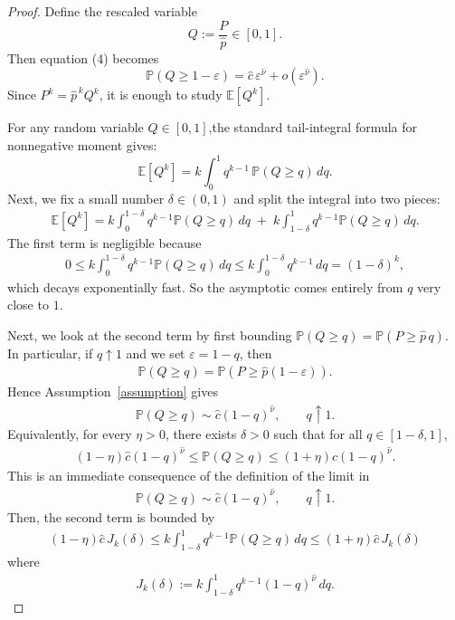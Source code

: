 \documentclass{article}
\theoremstyle{remark} %
\begin{document}
\begin{proof}
Define the rescaled variable
$$
Q := \frac{P}{\hat{p}}\in[0,1].
$$
Then equation (4) becomes
\begin{equation}
\mathbb{P}(Q \ge 1-\varepsilon) = \hat{c}\,\varepsilon^{\hat{\nu}} + o(\varepsilon^{\hat{\nu}}). 
\end{equation}
Since $P^k=\hat{p}^{\,k}Q^k$, it is enough to study $\mathbb{E}[Q^k]$.

For any random variable $Q\in[0,1]$,the standard tail-integral formula for nonnegative moment gives:
\begin{equation}
\mathbb{E}[Q^k] = k\int_0^1 q^{k-1}\,\mathbb{P}(Q\ge q)\,dq. 
\end{equation}
Next, we fix a small number $\delta\in(0,1)$ and split the integral into two pieces:
\begin{align}
\mathbb{E}[Q^k] = k\int_0^{1-\delta} q^{k-1}\mathbb{P}(Q\ge q)\,dq
\;+\;
k\int_{1-\delta}^{1} q^{k-1}\mathbb{P}(Q\ge q)\,dq.    
\end{align}
The first term is negligible because
\begin{align}
0\le k\int_0^{1-\delta} q^{k-1}\mathbb{P}(Q\ge q)\,dq
\le k\int_0^{1-\delta} q^{k-1}\,dq = (1-\delta)^k,
\end{align}
which decays exponentially fast. So the asymptotic comes entirely from $q$ very close to $1$. 

Next, we look at the second term by first bounding $\mathbb P(Q\ge q)=\mathbb P(P\ge \hat p\,q)$. In particular, if $q\uparrow 1$ and we set $\varepsilon=1-q$, then
\begin{align}
\mathbb P(Q\ge q)
=
\mathbb P \left(P\ge \hat p(1-\varepsilon)\right).
\end{align}
Hence Assumption~\ref{assumption} gives
\begin{align}
\mathbb P(Q\ge q)\sim \hat c(1-q)^{\hat\nu},
\qquad q\uparrow 1.
\end{align}
Equivalently, for every $\eta>0$, there exists $\delta>0$ such that for all $q\in[1-\delta,1]$,
\begin{align}
(1-\eta)\hat c(1-q)^{\hat\nu}
\le
\mathbb P(Q\ge q)
\le
(1+\eta)\hat c(1-q)^{\hat\nu}.
\end{align}
This is an immediate consequence of the definition of the limit in
\begin{align}
\mathbb P(Q\ge q)\sim \hat c(1-q)^{\hat\nu}, \qquad q\uparrow 1.
\end{align}
Then, the second term is bounded by
\begin{align}
(1-\eta)\hat{c}\,J_k(\delta)\le k\int_{1-\delta}^{1} q^{k-1}\mathbb{P}(Q\ge q)\,dq \le (1+\eta)\hat{c}\,J_k(\delta) 
\end{align}
where
\begin{align}
J_k(\delta) := k\int_{1-\delta}^{1} q^{k-1}(1-q)^{\hat{\nu}}\,dq.
\end{align}


\end{proof}
\end{document}
